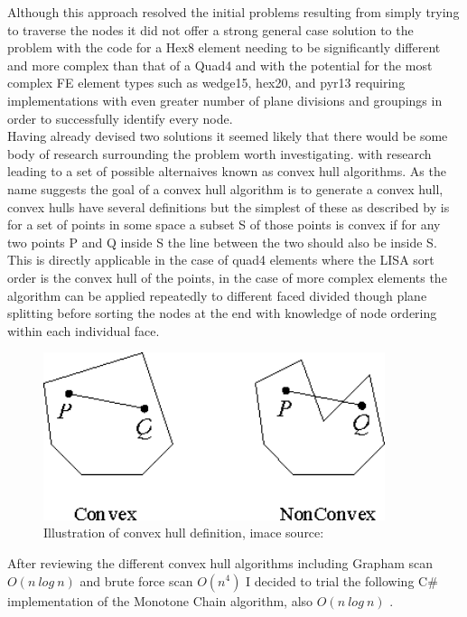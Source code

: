 \noindent
Although this approach resolved the initial problems resulting from simply trying to traverse the nodes it did not offer a strong general case solution to the problem with the code for a Hex8 element needing to be significantly different and more complex than that of a Quad4 and with the potential for the most complex FE element types such as wedge15, hex20, and pyr13 requiring implementations with even greater number of plane divisions and groupings in order to successfully identify every node. \\ 


\noindent
Having already devised two solutions it seemed likely that there would be some body of research surrounding the problem worth investigating. with research leading to a set of possible alternaives known as convex hull algorithms. As the name suggests the goal of a convex hull algorithm is to generate a convex hull, convex hulls have several definitions but the simplest of these as described by \cite{ConvexHulls} is for a set of points in some space a subset S of those points is convex if for any two points P and Q  inside S the line between the two should also be inside S. This is directly applicable in the case of quad4 elements where the LISA sort order is the convex hull of the points, in the case of more complex elements the algorithm can be applied repeatedly to different faced divided though plane splitting before sorting the nodes at the end with knowledge of node ordering within each individual face. \\ 

\begin{figure}[!h]
  \centerline{\includegraphics[width=100mm , scale=1]{../Graphics/ConvexHullGraphic.png}}
  \caption{Illustration of convex hull definition, imace source: \cite{ConvexHulls}
  }
  \label{fig:h-refinementImp}
\end{figure}

\noindent
After reviewing the different convex hull algorithms including Grapham scan \cite{GrahamScan} $O(n\ log\ n)$ and brute force scan $O(n^4)$ \cite{ConvexHulls} \cite{BruteConvex} I decided to trial the following C\# implementation of the Monotone Chain algorithm, also $O(n\ log\ n)$ \cite{CSharpConvexHull}. \\ 

